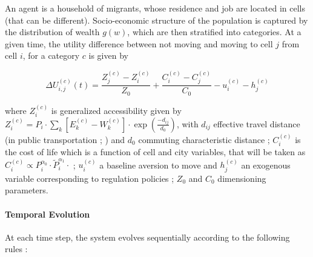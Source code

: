 An agent is a household of migrants, whose residence and job are located in cells (that can be different). Socio-economic structure of the population is captured by the distribution of wealth $g(w)$, which are then stratified into categories. At a given time, the utility difference between not moving and moving to cell $j$ from cell $i$, for a category $c$ is given by

\[
\Delta U_{i,j}^{(c)}(t) = \frac{Z_j^{(c)}- Z_i^{(c)}}{Z_0} + \frac{C_i^{(c)}- C_j^{(c)}}{C_0} - u_i^{(c)} - h_j^{(c)}
\]

where $Z_i^{(c)}$ is generalized accessibility given by $Z_i^{(c)} = P_i \cdot \sum_k \left[E_k^{(c)}-W_k^{(c)}\right]\cdot \exp{\left(\frac{-d_{ij}}{d_0}\right)}$, with $d_{ij}$ effective travel distance (in public transportation ; ) and $d_0$ commuting characteristic distance ; $C_i^{(c)}$ is the cost of life which is a function of cell and city variables, that will be taken as $C_i^{(c)} \propto P_i^{\alpha_0}\cdot  \tilde{P}_i^{\alpha_1}\cdot$ ; $u_i^{(c)}$ a baseline aversion to move and $h_j^{(c)}$ an exogenous variable corresponding to regulation policies ; $Z_0$ and $C_0$ dimensioning parameters.

\paragraph{Temporal Evolution}

At each time step, the system evolves sequentially according to the following rules :

